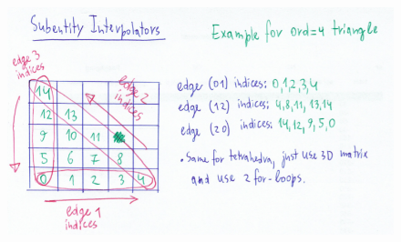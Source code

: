 \begin{figure}[hp]
    \centering
    \includegraphics[scale=0.5]{doc-pics/pic-subentity-interpolators-method.png}
\end{figure}